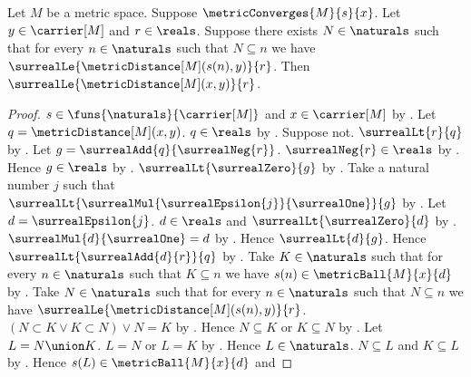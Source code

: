 \begin{theorem}\label{metric_limit_respects_closed_distance_bound}
    Let $M$ be a metric space.
    Suppose $\metricConverges{M}{s}{x}$.
    Let $y\in\carrier[M]$ and $r\in\reals$.
    Suppose there exists $N\in\naturals$ such that
        for every $n\in\naturals$ such that $N\subseteq n$ we have
            $\surrealLe{\metricDistance[M](s(n),y)}{r}$.
    Then $\surrealLe{\metricDistance[M](x,y)}{r}$.
\end{theorem}
\begin{proof}
    $s\in\funs{\naturals}{\carrier[M]}$ and $x\in\carrier[M]$
        by .
    Let $q=\metricDistance[M](x,y)$.
    $q\in\reals$ by .
    Suppose not.
    $\surrealLt{r}{q}$
        by
        .
    Let $g=\surrealAdd{q}{\surrealNeg{r}}$.
    $\surrealNeg{r}\in\reals$ by .
    Hence $g\in\reals$ by .
    $\surrealLt{\surrealZero}{g}$
        by .
    Take a natural number $j$ such that
        $\surrealLt{
            \surrealMul{\surrealEpsilon{j}}{\surrealOne}}{g}$
        by
        .
    Let $d=\surrealEpsilon{j}$.
    $d\in\reals$ and $\surrealLt{\surrealZero}{d}$
        by .
    $\surrealMul{d}{\surrealOne}=d$
        by .
    Hence $\surrealLt{d}{g}$.
    Hence $\surrealLt{\surrealAdd{d}{r}}{q}$
        by
        .
    Take $K\in\naturals$ such that for every $n\in\naturals$
        such that $K\subseteq n$ we have
            $s(n)\in\metricBall{M}{x}{d}$
        by .
    Take $N\in\naturals$ such that for every $n\in\naturals$
        such that $N\subseteq n$ we have
            $\surrealLe{\metricDistance[M](s(n),y)}{r}$.
    $(N\subset K\lor K\subset N)\lor N=K$
        by
        .
    Hence $N\subseteq K$ or $K\subseteq N$
        by .
    Let $L=N\union K$.
    $L=N$ or $L=K$
        by
        .
    Hence $L\in\naturals$.
    $N\subseteq L$ and $K\subseteq L$
        by .
    Hence $s(L)\in\metricBall{M}{x}{d}$ and

\end{proof}

